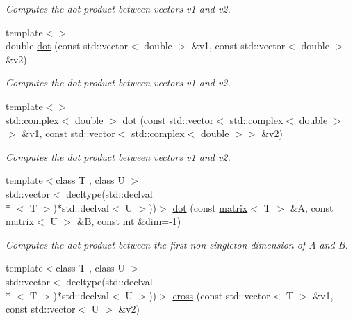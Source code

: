 \begin{DoxyCompactItemize}
\begin{DoxyCompactList}\small\item\em Computes the dot product between vectors v1 and v2. \end{DoxyCompactList}\item 
\hypertarget{namespacekeycpp_ad14584bb6e102379fb176e7a864c9cf8}{{\footnotesize template$<$$>$ }\\double \hyperlink{namespacekeycpp_ad14584bb6e102379fb176e7a864c9cf8}{dot} (const std\-::vector$<$ double $>$ \&v1, const std\-::vector$<$ double $>$ \&v2)}\label{namespacekeycpp_ad14584bb6e102379fb176e7a864c9cf8}

\begin{DoxyCompactList}\small\item\em Computes the dot product between vectors v1 and v2. \end{DoxyCompactList}\item 
\hypertarget{namespacekeycpp_af4148cd818cee05304763a197bf56e3c}{{\footnotesize template$<$$>$ }\\std\-::complex$<$ double $>$ \hyperlink{namespacekeycpp_af4148cd818cee05304763a197bf56e3c}{dot} (const std\-::vector$<$ std\-::complex$<$ double $>$$>$ \&v1, const std\-::vector$<$ std\-::complex$<$ double $>$$>$ \&v2)}\label{namespacekeycpp_af4148cd818cee05304763a197bf56e3c}

\begin{DoxyCompactList}\small\item\em Computes the dot product between vectors v1 and v2. \end{DoxyCompactList}\item 
\hypertarget{namespacekeycpp_ac3f44dfd7e58788078a8cba3696d3a39}{{\footnotesize template$<$class T , class U $>$ }\\std\-::vector$<$ decltype(std\-::declval\\*
$<$ T $>$)$\ast$std\-::declval$<$ U $>$))$>$ \hyperlink{namespacekeycpp_ac3f44dfd7e58788078a8cba3696d3a39}{dot} (const \hyperlink{classkeycpp_1_1matrix}{matrix}$<$ T $>$ \&A, const \hyperlink{classkeycpp_1_1matrix}{matrix}$<$ U $>$ \&B, const int \&dim=-\/1)}\label{namespacekeycpp_ac3f44dfd7e58788078a8cba3696d3a39}

\begin{DoxyCompactList}\small\item\em Computes the dot product between the first non-\/singleton dimension of A and B. \end{DoxyCompactList}\item 
\hypertarget{namespacekeycpp_a73fa9874e6923dd54c95d52a22a99d00}{{\footnotesize template$<$class T , class U $>$ }\\std\-::vector$<$ decltype(std\-::declval\\*
$<$ T $>$)$\ast$std\-::declval$<$ U $>$))$>$ \hyperlink{namespacekeycpp_a73fa9874e6923dd54c95d52a22a99d00}{cross} (const std\-::vector$<$ T $>$ \&v1, const std\-::vector$<$ U $>$ \&v2)}\label{namespacekeycpp_a73fa9874e6923dd54c95d52a22a99d00}


\end{DoxyCompactItemize}
